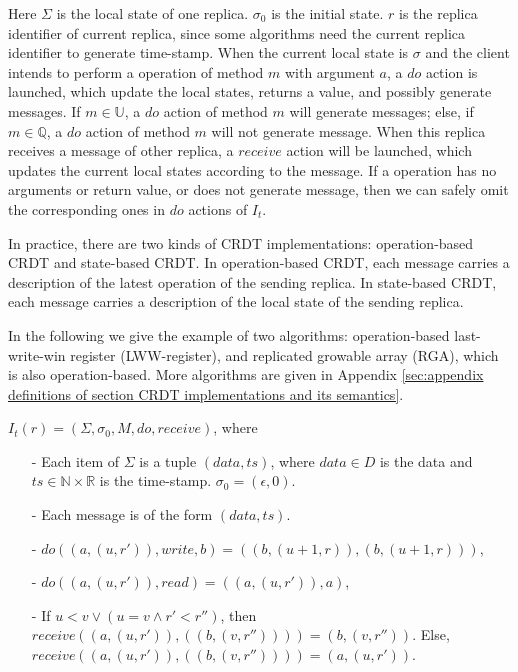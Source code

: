 Here $\Sigma$ is the local state of one replica. $\sigma_0$ is the initial state. $r$ is the replica identifier of current replica, since some algorithms need the current replica identifier to generate time-stamp. When the current local state is $\sigma$ and the client intends to perform a operation of method $m$ with argument $a$, a $\mathit{do}$ action is launched, which update the local states, returns a value, and possibly generate messages. If $m \in \mathbb{U}$, a $\mathit{do}$ action of method $m$ will generate messages; else, if $m \in \mathbb{Q}$, a $\mathit{do}$ action of method $m$ will not generate message. When this replica receives a message of other replica, a $\mathit{receive}$ action will be launched, which updates the current local states according to the message. If a operation has no arguments or return value, or does not generate message, then we can safely omit the corresponding ones in $\mathit{do}$ actions of $I_t$.

In practice, there are two kinds of CRDT implementations: operation-based CRDT and state-based CRDT. In operation-based CRDT, each message carries a description of the latest operation of the sending replica. In state-based CRDT, each message carries a description of the local state of the sending replica.

In the following we give the example of two algorithms: operation-based last-write-win register (LWW-register), and replicated growable array (RGA), which is also operation-based. More algorithms are given in Appendix \ref{sec:appendix definitions of section CRDT implementations and its semantics}.

\begin{example}
\label{definition:LWW-register}
$I_t(r) = (\Sigma, \sigma_0, M, \mathit{do},\mathit{receive})$, where

\begin{itemize}
\setlength{\itemsep}{0.5pt}
\item[-] Each item of $\Sigma$ is a tuple $(\mathit{data},\mathit{ts})$, where $\mathit{data} \in D$ is the data and $\mathit{ts} \in \mathbb{N} \times \mathbb{R}$ is the time-stamp. $\sigma_0 = (\epsilon, 0)$.

\item[-] Each message is of the form $(\mathit{data},\mathit{ts})$.

\item[-] $\mathit{do}((a,(u,r')),\mathit{write},b) = ((b,(u+1,r)),(b,(u+1,r)))$,

\item[-] $\mathit{do}((a,(u,r')),\mathit{read}) = ((a,(u,r')),a)$,

\item[-] If $u<v \vee (u=v \wedge r' < r'')$, then $\mathit{receive}((a,(u,r')), ((b,(v,r'')))) = (b,(v,r''))$. Else, $\mathit{receive}((a,(u,r')), ((b,(v,r'')))) = (a,(u,r'))$.
\end{itemize}
\end{example}


